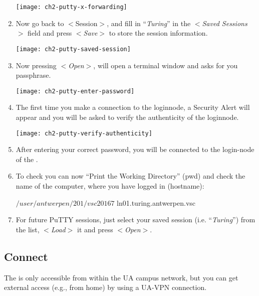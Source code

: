 \begin{enumerate}
  \texttt{[image: ch2-putty-x-forwarding]}

    \item  Now go back to $<$Session$>$, and fill in ``\emph{Turing}'' in the
      $<$\emph{Saved Sessions}$>$ field and press $<$\emph{Save}$>$ to
      store the session information.

  \texttt{[image: ch2-putty-saved-session]}

    \item  Now pressing $<$\emph{Open}$>$, will open a terminal window and
      asks for you passphrase.

  \texttt{[image: ch2-putty-enter-password]}

    \item  The first time you make a connection to the loginnode, a Security
      Alert will appear and you will be asked to verify the authenticity of the
      loginnode.

  \texttt{[image: ch2-putty-verify-authenticity]}

    \item  After entering your correct password, you will be connected to the
      login-node of the \hpc.
    \item  To check you can now ``Print the Working Directory'' (pwd) and check
      the name of the computer, where you have logged in (hostname):

  \begin{prompt}
  $ %
  /user/antwerpen/201/vsc20167
  $ %
  ln01.turing.antwerpen.vsc
  \end{prompt}

    \item  For future PuTTY sessions, just select your saved session (i.e.
      ``\emph{Turing}'') from the list, $<$\emph{Load}$>$ it and press
      $<$\emph{Open}$>$.
  \end{enumerate}

\fi

\subsection{Connect}
\label{sec:connect}

The \hpc is only accessible from within the UA campus network, but you can
get external access (e.g., from home) by using a UA-VPN connection.

